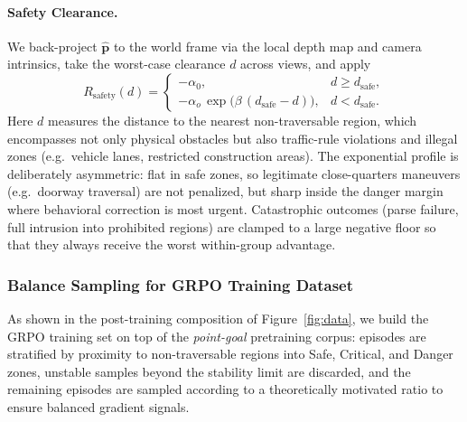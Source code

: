 \paragraph{Safety Clearance.}
We back-project $\hat{\mathbf{p}}$ to the world frame via the local
depth map and camera intrinsics, take the worst-case clearance $d$
across views, and apply
\begin{equation}
R_{\mathrm{safety}}(d) =
\begin{cases}
-\alpha_0, & d \ge d_{\mathrm{safe}},\\
-\alpha_o\,\exp\!\bigl(\beta\,(d_{\mathrm{safe}}{-}d)\bigr), & d < d_{\mathrm{safe}}.
\end{cases}
\label{eq:obstacle}
\end{equation}
Here $d$ measures the distance to the nearest non-traversable region,
which encompasses not only physical obstacles but also traffic-rule
violations and illegal zones (e.g.\ vehicle lanes, restricted
construction areas). The exponential profile is deliberately
asymmetric: flat in safe zones, so legitimate close-quarters
maneuvers (e.g.\ doorway traversal) are not penalized, but sharp
inside the danger margin where behavioral correction is most urgent.
Catastrophic outcomes (parse failure, full intrusion into prohibited
regions) are clamped to a large negative floor so that they always
receive the worst within-group advantage.


\subsubsection{Balance Sampling for GRPO Training Dataset}
\label{sec:grpo-trainingdata}

As shown in the post-training composition of Figure~\ref{fig:data}, we
build the GRPO training set on top of the  \textit{point-goal} pretraining
corpus: episodes are stratified by proximity to non-traversable
regions into Safe, Critical, and Danger zones, unstable samples beyond
the stability limit are discarded, and the remaining episodes are
sampled according to a theoretically motivated ratio to ensure
balanced gradient signals.

